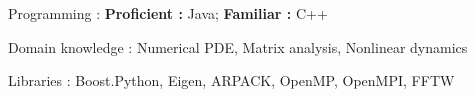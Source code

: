


\begin{cvskills}


\cvskill
	{Programming : } 
	{\textbf{Proficient :}  Java;
	\textbf{Familiar :} C++} 


\cvskill
	{Domain knowledge : }
	{Numerical PDE, Matrix analysis, Nonlinear dynamics}


\cvskill
{Libraries : }
{Boost.Python, Eigen, ARPACK, OpenMP, OpenMPI, FFTW}


\end{cvskills}
